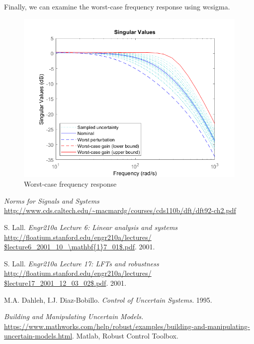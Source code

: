 \documentclass{article}[12pt]
\def\1{\mathbf{1}}
\begin{document}
Finally, we can examine the worst-case frequency response using wcsigma.
\begin{figure}[H]
    \centering
    \includegraphics[scale=.6]{figures/wcsigma.png}
    \caption{Worst-case frequency response}
    \label{fig:wcgain}
\end{figure}
\clearpage



\begin{thebibliography}{5}
\textit{Norms for Signals and Systems}
\url{http://www.cds.caltech.edu/~macmardg/courses/cds110b/dft/dft92-ch2.pdf}

S. Lall.
\textit{Engr210a Lecture 6: Linear analysis and systems}
\url{http://floatium.stanford.edu/engr210a/lectures/ $lecture6\_2001\_10\_\17\_01$.pdf}.
2001.

S. Lall.
\textit{Engr210a Lecture 17: LFTs and robustness}
\url{http://floatium.stanford.edu/engr210a/lectures/ $lecture17\_2001\_12\_03\_02$.pdf}.
2001.

M.A. Dahleh, I.J. Diaz-Bobillo.
\textit{Control of Uncertain Systems.}
1995.

\textit{Building and Manipulating Uncertain Models.}
\url{https://www.mathworks.com/help/robust/examples/building-and-manipulating-uncertain-models.html}.
Matlab, Robust Control Toolbox.


\end{thebibliography}
%
 
\end{document}
